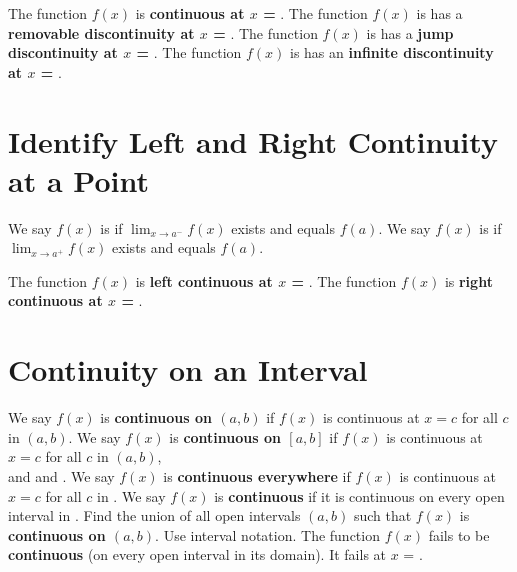\documentclass[10pt, addpoints]{exam}
\begin{document}
\begin{questions}
\question The function $f(x)$ is \textbf{continuous at \boldmath $x$ =} \fillin[][3in].
\question The function $f(x)$ is has a \textbf{removable discontinuity at \boldmath $x$ =} \fillin[][3in].
\question The function $f(x)$ is has a \textbf{jump discontinuity at \boldmath $x$ =} \fillin[][3in].
\question The function $f(x)$ is has an \textbf{infinite discontinuity at \boldmath $x$ =} \fillin[][3in].

\section{Identify Left and Right Continuity at a Point}
\question We say $f(x)$ is \fillin[left continuous at $x=a$][3in] if $\lim_{x\to a^-}f(x)$ exists and equals $f(a)$.
\question We say $f(x)$ is \fillin[right continuous at $x=a$][3in] if $\lim_{x\to a^+}f(x)$ exists and equals $f(a)$.

\question The function $f(x)$ is \textbf{left continuous at \boldmath $x$ =} \fillin[][3in].
\question The function $f(x)$ is \textbf{right continuous at \boldmath $x$ =} \fillin[][3in].

\section{Continuity on an Interval}
We say $f(x)$ is \textbf{continuous on \boldmath $(a,b)$}
	if $f(x)$ is continuous at $x=c$ for all $c$ in $(a,b)$.
\question We say $f(x)$ is \textbf{continuous on \boldmath $[a,b]$}
	if $f(x)$ is continuous at $x=c$ for all $c$ in $(a,b)$, \\[3ex]
	and \fillin[right continuous at $x=a$][3in] and \fillin[left continuous at $x=a$][3in].
\question We say $f(x)$ is \textbf{continuous everywhere}
	if $f(x)$ is continuous at $x=c$ for all $c$ in \fillin[][1in].
\question We say $f(x)$ is \textbf{continuous} if it is continuous on every open interval in \fillin[][2.5in].
\question Find the union of all open intervals $(a,b)$ such that $f(x)$
	is \textbf{continuous on \boldmath $(a,b)$}. Use interval notation.
\question The function $f(x)$ fails to be \textbf{continuous} (on every open interval in its domain). 
	It fails at $x$ = \fillin[][1.4in].

\end{questions}
\end{document}
